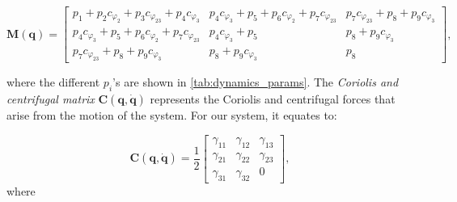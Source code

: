 \begin{equation}
    \label{eq:modelling_kinetic_energy_inertia_matrix}
    \mathbf{M}(\mathbf{q}) = \left[\begin{matrix}p_{1} + p_{2} c_{\varphi_{2}} + p_{3} c_{\varphi_{23}} + p_{4} c_{\varphi_{3}} & p_{4} c_{\varphi_{3}} + p_{5} + p_{6} c_{\varphi_{2}} + p_{7} c_{\varphi_{23}} & p_{7} c_{\varphi_{23}} + p_{8} + p_{9} c_{\varphi_{3}}\\p_{4} c_{\varphi_{3}} + p_{5} + p_{6} c_{\varphi_{2}} + p_{7} c_{\varphi_{23}} & p_{4} c_{\varphi_{3}} + p_{5} & p_{8} + p_{9} c_{\varphi_{3}}\\p_{7} c_{\varphi_{23}} + p_{8} + p_{9} c_{\varphi_{3}} & p_{8} + p_{9} c_{\varphi_{3}} & p_{8}\end{matrix}\right],
\end{equation}

where the different $p_i$'s are shown in \cref{tab:dynamics_params}. The \textit{Coriolis and centrifugal matrix} $\mathbf{C}(\mathbf{q}, \dot{\mathbf{q}})$ represents the Coriolis and centrifugal forces that arise from the motion of the system. For our system, it equates to:

\begin{equation}
    \label{eq:modelling_coriolis_matrix}
    \mathbf{C}(\mathbf{q}, \dot{\mathbf{q}})
    =
    \frac{1}{2}
    \begin{bmatrix}
        \gamma_{11} & \gamma_{12} & \gamma_{13} \\
        \gamma_{21} & \gamma_{22} & \gamma_{23} \\
        \gamma_{31} & \gamma_{32} & 0
    \end{bmatrix},
\end{equation}
where

